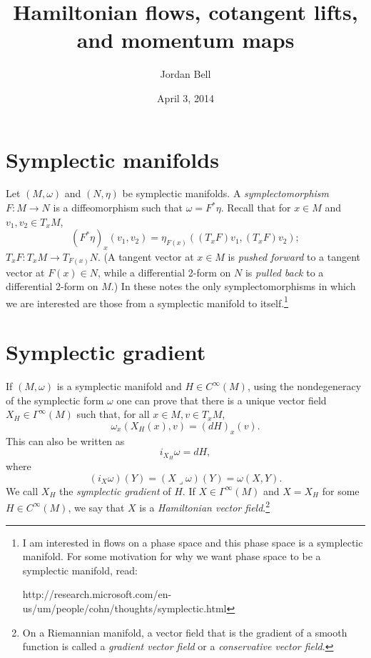 \documentclass{article}
\begin{document}
\title{Hamiltonian flows, cotangent lifts, and momentum maps}
\author{Jordan Bell}
\date{April 3, 2014}

\maketitle

\section{Symplectic manifolds}
Let $(M,\omega)$ and $(N,\eta)$ be symplectic manifolds. A {\em symplectomorphism} $F:M \to N$ is a diffeomorphism
such that $\omega=F^* \eta$. Recall that for $x \in M$ and $v_1,v_2 \in T_xM$,
\[
(F^* \eta)_x(v_1,v_2)=\eta_{F(x)}((T_x F)v_1,(T_x F)v_2);
\]
$T_x F: T_x M \to T_{F(x)}N$. (A tangent vector at $x \in M$ is {\em pushed forward} to a tangent vector at $F(x) \in N$, while a differential 2-form on $N$ is {\em pulled back} to a 
differential 2-form on $M$.) In these notes the only symplectomorphisms in which we are interested  are those from a symplectic manifold to itself.\footnote{I am interested in flows
on a phase space and this phase space is a symplectic manifold. For some motivation for why we want phase space to be a symplectic manifold, read:

 http://research.microsoft.com/en-us/um/people/cohn/thoughts/symplectic.html}

\section{Symplectic gradient}
If $(M,\omega)$ is a symplectic manifold and $H \in C^\infty(M)$, using the nondegeneracy of the symplectic form $\omega$ one can prove that there is a unique
vector field
$X_H \in \Gamma^\infty(M)$ 
such that, for all $x \in M, v \in T_xM$,
\[
\omega_x(X_H(x),v)=(dH)_x(v).
\]
This can also be written as 
\[
i_{X_H} \omega = dH,
\]
where 
\[
(i_X \omega)(Y)= (X \lrcorner \omega)(Y)=\omega(X,Y).
\]
We call $X_H$ the {\em symplectic gradient} of $H$. If $X \in \Gamma^\infty(M)$ and $X=X_H$ for some $H \in C^\infty(M)$, we say that $X$ is a {\em Hamiltonian vector
field}.\footnote{On a Riemannian manifold, a vector field that is the gradient of a smooth function is called a {\em gradient vector field} or a {\em conservative
vector field}.}
\end{document}
